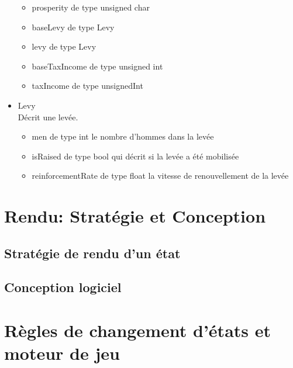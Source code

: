 \documentclass[a4paper,12pt]{article}
\begin{document}
\begin{itemize}
\begin{itemize}
\item prosperity de type unsigned char
\item baseLevy de type Levy
\item levy de type Levy
\item baseTaxIncome de type unsigned int 
\item taxIncome de type unsignedInt
\end{itemize}
\item Levy\\
Décrit une levée.
\begin{itemize}
\item men de type int le nombre d'hommes dans la levée
\item isRaised de type bool qui décrit si la levée a été mobilisée
\item reinforcementRate de type float la vitesse de renouvellement de la levée
\end{itemize}
\end{itemize}



\clearpage
\section{Rendu: Stratégie et Conception}

\subsection{Stratégie de rendu d'un état}


\subsection{Conception logiciel}


\clearpage
\section{Règles de changement d'états et moteur de jeu}
\end{document}

